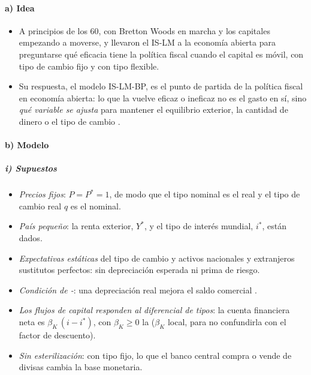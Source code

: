 \documentclass[11pt]{article}
\begin{document}
\paragraph{a) Idea}

\begin{itemize}
\item A principios de los 60, con Bretton Woods en marcha y los capitales empezando a moverse, \textcite{Fleming1962Domestic} y \textcite{Mundell1963Capital} llevaron el IS-LM a la economía abierta para preguntarse qué eficacia tiene la política fiscal cuando el capital es móvil, con tipo de cambio fijo y con tipo flexible.
\item Su respuesta, el modelo IS-LM-BP, es el punto de partida de la política fiscal en economía abierta: lo que la vuelve eficaz o ineficaz no es el gasto en sí, sino \emph{qué variable se ajusta} para mantener el equilibrio exterior, la cantidad de dinero o el tipo de cambio .
\end{itemize}

\paragraph{b) Modelo}

\subparagraph{i) Supuestos}

\begin{itemize}
\item \emph{Precios fijos}: $P=P^*=1$, de modo que el tipo nominal es el real y el tipo de cambio real $q$ es el nominal.
\item \emph{País pequeño}: la renta exterior, $Y^*$, y el tipo de interés mundial, $i^*$, están dados.
\item \emph{Expectativas estáticas} del tipo de cambio y activos nacionales y extranjeros sustitutos perfectos: sin depreciación esperada ni prima de riesgo.
\item \emph{Condición de -}: una depreciación real mejora el saldo comercial .
\item \emph{Los flujos de capital responden al diferencial de tipos}: la cuenta financiera neta es $\beta_K\,(i-i^*)$, con $\beta_K\ge0$ la  ($\beta_K$ local, para no confundirla con el factor de descuento).
\item \emph{Sin esterilización}: con tipo fijo, lo que el banco central compra o vende de divisas cambia la base monetaria.
\end{itemize}
\end{document}
